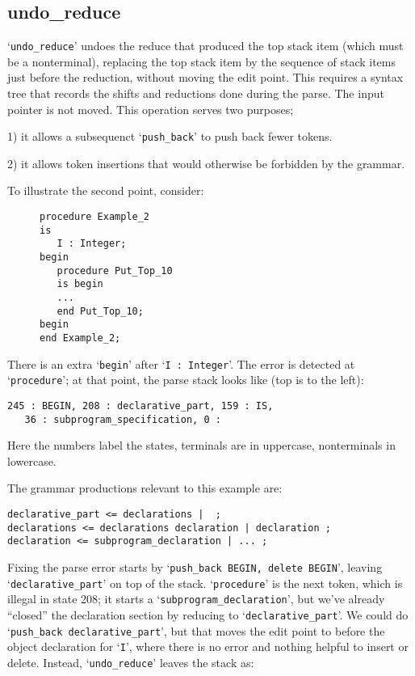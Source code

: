 \documentclass{article}
\newcommand{\code}[1]{`{\tt #1}'}
\begin{document}
\subsection{undo\_reduce}
\code{undo\_reduce} undoes the reduce that produced the top stack item
(which must be a nonterminal), replacing the top stack item by the
sequence of stack items just before the reduction, without
moving the edit point. This requires a syntax tree that records the
shifts and reductions done during the parse. The input pointer is not
moved. This operation serves two purposes;

1) it allows a subsequenct \code{push\_back} to push back fewer tokens.

2) it allows token insertions that would otherwise be forbidden by the
grammar.

To illustrate the second point, consider:
\begin{figure}[H]
\begin{verbatim}
procedure Example_2
is
   I : Integer;
begin
   procedure Put_Top_10
   is begin
   ...
   end Put_Top_10;
begin
end Example_2;
\end{verbatim}
\caption{}
\label{ex:extra_begin_2}
\end{figure}
There is an extra \code{begin} after
\code{I : Integer}. The error is detected at \code{procedure}; at that point,
the parse stack looks like (top is to the left):
\begin{verbatim}
245 : BEGIN, 208 : declarative_part, 159 : IS,
   36 : subprogram_specification, 0 :
\end{verbatim}
Here the numbers label the states, terminals are in uppercase,
nonterminals in lowercase.

The grammar productions relevant to this example are:
\begin{verbatim}
declarative_part <= declarations |  ;
declarations <= declarations declaration | declaration ;
declaration <= subprogram_declaration | ... ;
\end{verbatim}

Fixing the parse error starts by \code{push\_back BEGIN, delete BEGIN},
leaving \code{declarative\_part} on top of the stack. \code{procedure}
is the next token, which is illegal in state 208; it starts a
\code{subprogram\_declaration}, but we've already ``closed'' the
declaration section by reducing to \code{declarative\_part}. We could
do \code{push\_back declarative\_part}, but that moves the edit point to
before the object declaration for \code{I}, where there is no error
and nothing helpful to insert or delete. Instead, \code{undo\_reduce}
leaves the stack as:
\end{document}
